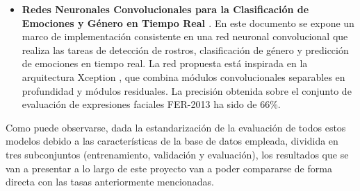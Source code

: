 \begin{itemize}
  \item \textbf{Redes Neuronales Convolucionales para la Clasificación de Emociones y Género en Tiempo Real \cite{Arriaga}}. En este documento se expone un marco de implementación consistente en una red neuronal convolucional que realiza las tareas de detección de rostros, clasificación de género y predicción de emociones en tiempo real. La red propuesta está inspirada en la arquitectura Xception \cite{Xception}, que combina módulos convolucionales separables en profundidad y módulos residuales. La precisión obtenida sobre el conjunto de evaluación de expresiones faciales FER-2013 ha sido de 66\%.
\end{itemize}

Como puede observarse, dada la estandarización de la evaluación de todos estos modelos debido a las características de la base de datos empleada, dividida en tres subconjuntos (entrenamiento, validación y evaluación), los resultados que se van a presentar a lo largo de este proyecto van a poder compararse de forma directa con las tasas anteriormente mencionadas.